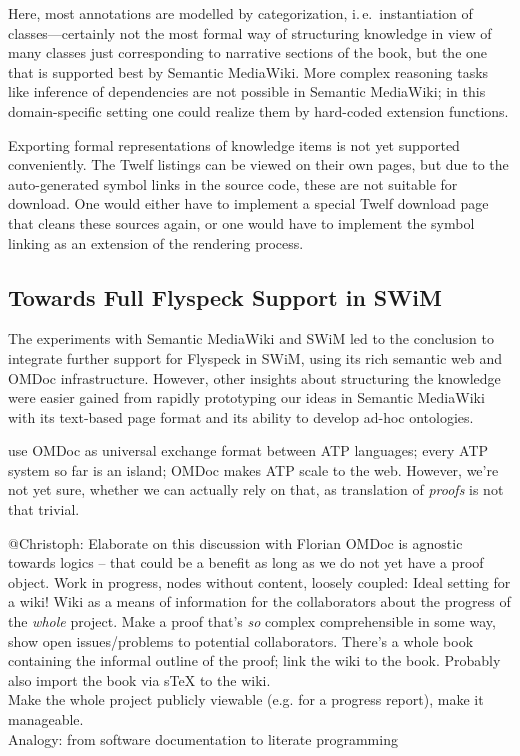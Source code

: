 \documentclass{llncs}
\begin{document}
Here, most annotations are modelled by categorization, i.\,e.\ instantiation of
classes---certainly not the most formal way of structuring knowledge in view of many
classes just corresponding to narrative sections of the book, but the one that is
supported best by Semantic MediaWiki.  More complex reasoning tasks like inference of
dependencies are not possible in Semantic MediaWiki; in this domain-specific setting one
could realize them by hard-coded extension functions.

Exporting formal representations of knowledge items is not yet supported conveniently.
The Twelf listings can be viewed on their own pages, but due to the auto-generated symbol
links in the source code, these are not suitable for download.  One would either have to
implement a special Twelf download page that cleans these sources again, or one would have
to implement the symbol linking as an extension of the rendering process.

\subsection{Towards Full Flyspeck Support in SWiM}
\label{sec:flyspeck-swim}

The experiments with Semantic MediaWiki and SWiM led to the conclusion to integrate
further support for Flyspeck in SWiM, using its rich semantic web and OMDoc
infrastructure.  However, other insights about structuring the knowledge were easier
gained from rapidly prototyping our ideas in Semantic MediaWiki with its text-based page
format and its ability to develop ad-hoc ontologies.



use OMDoc as universal exchange format between ATP languages; every ATP system so far is
an island; OMDoc makes ATP scale to the web.  However, we're not yet sure, whether we can actually rely on that, as translation of \emph{proofs} is not
that trivial.


\begin{todo}{@Christoph: Elaborate on this discussion with Florian}
  OMDoc is agnostic towards logics -- that could be a benefit as long as we do not yet
  have a proof object. Work in progress, nodes without content, loosely coupled: Ideal
  setting for a wiki!  Wiki as a means of information for the collaborators about the
  progress of the \emph{whole} project.  Make a proof that's \emph{so} complex
  comprehensible in some way, show open issues/problems to potential collaborators.
  There's a whole book containing the informal outline of the proof; link the wiki to the
  book.  Probably also import the book via sTeX to the wiki.\\
  Make the whole project publicly viewable (e.g. for a progress report), make it
  manageable.\\
  Analogy: from software documentation to literate programming
\end{todo}
\end{document}
